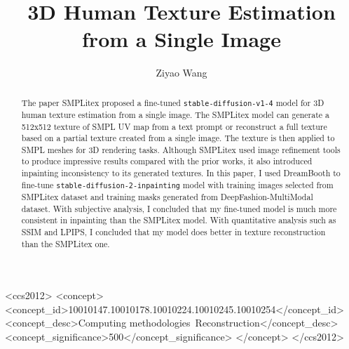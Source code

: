 \documentclass[acmtog]{acmart}
\begin{document}
\title{3D Human Texture Estimation from a Single Image}

\author{Ziyao Wang}

\renewcommand{\shortauthors}{Ziyao Wang}

\begin{abstract}
  The paper SMPLitex \cite{casas2023smplitex} proposed a fine-tuned \texttt{stable-diffusion-v1-4} model for 3D human texture estimation from a single image. The SMPLitex model can generate a 512x512 texture of SMPL UV map from a text prompt or reconstruct a full texture based on a partial texture created from a single image. The texture is then applied to SMPL meshes for 3D rendering tasks. Although SMPLitex used image refinement tools to produce impressive results compared with the prior works, it also introduced inpainting inconsistency to its generated textures. In this paper, I used DreamBooth to fine-tune \texttt{stable-diffusion-2-inpainting} model with training images selected from SMPLitex dataset and training masks generated from DeepFashion-MultiModal dataset. With subjective analysis, I concluded that my fine-tuned model is much more consistent in inpainting than the SMPLitex model. With quantitative analysis such as SSIM and LPIPS, I concluded that my model does better in texture reconstruction than the SMPLitex one.
\end{abstract}

\begin{CCSXML}
  <ccs2012>
  <concept>
  <concept_id>10010147.10010178.10010224.10010245.10010254</concept_id>
  <concept_desc>Computing methodologies~Reconstruction</concept_desc>
  <concept_significance>500</concept_significance>
  </concept>
  </ccs2012>
\end{CCSXML}
\end{document}
